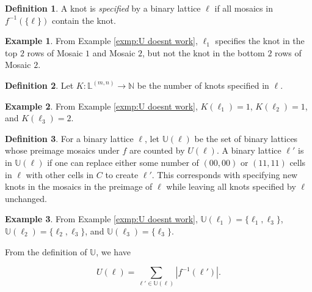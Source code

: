 \documentclass[12pt]{article}
\theoremstyle{plain}
\theoremstyle{definition}
\newtheorem{definition}{Definition}[section]
\theoremstyle{remark}
\theoremstyle{definition}
\newtheorem{exmp}{Example}[section]
\begin{document}
\begin{definition}
    A knot is \textit{specified} by a binary lattice $\ell$ if all mosaics in $f^{-1}(\{\ell\})$ contain the knot.
\end{definition}

\begin{exmp}
    From Example \ref{exmp:U doesnt work}, $\ell_1$ specifies the knot in the top $2$ rows of Mosaic $1$ and Mosaic $2$, but not the knot in the bottom $2$ rows of Mosaic $2$.
\label{exmp:specifying example}
\end{exmp}

\begin{definition}
    Let $K: \mathbb{L}^{(m,n)} \to \mathbb{N}$ be the number of knots specified in $\ell$.
\end{definition}

\begin{exmp}
    From Example \ref{exmp:U doesnt work}, $K(\ell_1) =1$, $K(\ell_2) =1$,  and $K(\ell_3) =2$.

\label{exmp:counting knots}
\end{exmp}

\begin{definition}
For a binary lattice $\ell$, let $\mathbb{U}(\ell)$ be the set of binary lattices whose preimage mosaics under $f$ are counted by $U(\ell)$. A binary lattice $\ell'$ is in $\mathbb{U}(\ell)$ if one can replace either some number of $(00,00)$ or $(11,11)$ cells in $\ell$ with other cells in $C$ to create $\ell'$. This corresponds with specifying new knots in the mosaics in the preimage of $\ell$ while leaving all knots specified by $\ell$ unchanged. 
\end{definition}

\begin{exmp}
From Example \ref{exmp:U doesnt work}, $\mathbb{U}(\ell_1) = \{\ell_1, \ell_3\}$, $\mathbb{U}(\ell_2) = \{\ell_2, \ell_3\}$, and $\mathbb{U}(\ell_3) = \{\ell_3\}$.


\label{exmp:four two mosaics}
\end{exmp}

From the definition of $\mathbb{U}$, we have

\begin{equation}
    U(\ell) = \sum_{\ell' \in \mathbb{U}(\ell)}|f^{-1}(\ell')|.
    \label{eq:U identity}
\end{equation}
\end{document}
